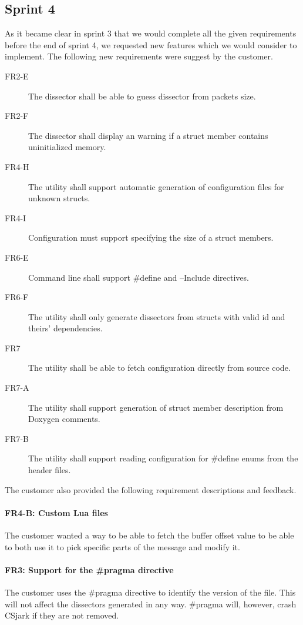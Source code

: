 \subsection{Sprint 4}
\label{sec:req:sprint4evo}
As it became clear in sprint 3 that we would complete all the given
requirements before the end of sprint 4, we requested new features which we
would consider to implement. The following new requirements were suggest by
the customer.
\begin{description}
	\item[FR2-E] The \gls{dissector} shall be able to guess dissector from packets size.
	\item[FR2-F] The \gls{dissector} shall display an warning if a struct member contains uninitialized memory.
	\item[FR4-H] The utility shall support automatic generation of configuration files for unknown structs.
	\item[FR4-I] Configuration must support specifying the size of a struct members.
	\item[FR6-E] Command line shall support \#define and --Include directives.
	\item[FR6-F] The utility shall only generate dissectors from structs with valid id and theirs' dependencies.
	\item[FR7] The utility shall be able to fetch configuration directly from source code.
	\item[FR7-A] The utility shall support generation of struct member description from Doxygen comments.
	\item[FR7-B] The utility shall support reading configuration for \#define enums from the header files.
\end{description}

\noindent The customer also provided the following requirement descriptions
and feedback.
\paragraph{FR4-B: Custom Lua files}
The customer wanted a way to be able to fetch the buffer offset value to be
able to both use it to pick specific parts of the message and modify it.

\paragraph{FR3: Support for the \#pragma directive}
The customer uses the \#pragma directive to identify the version of the file.
This will not affect the dissectors generated in any way. \#pragma will,
however, crash CSjark if they are not removed.

